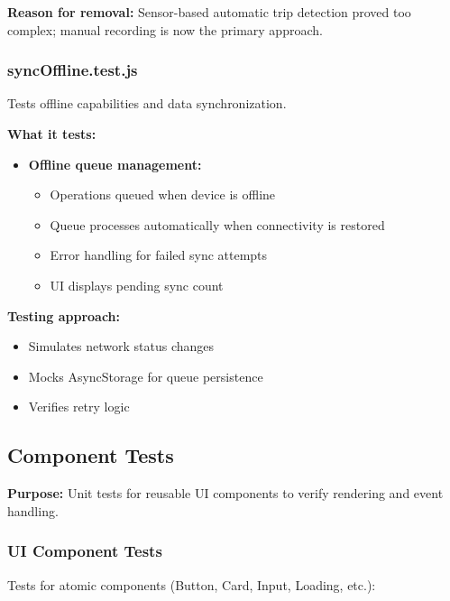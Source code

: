 \textbf{Reason for removal:} Sensor-based automatic trip detection proved too complex; manual recording is now the primary approach.

\subsubsection{syncOffline.test.js}
\label{subsubsec:sync_offline_test}

Tests offline capabilities and data synchronization.

\textbf{What it tests:}
\begin{itemize}
    \item \textbf{Offline queue management:}
    \begin{itemize}
        \item Operations queued when device is offline
        \item Queue processes automatically when connectivity is restored
        \item Error handling for failed sync attempts
        \item UI displays pending sync count
    \end{itemize}
\end{itemize}

\textbf{Testing approach:}
\begin{itemize}
    \item Simulates network status changes
    \item Mocks AsyncStorage for queue persistence
    \item Verifies retry logic
\end{itemize}

\subsection{Component Tests}
\label{subsec:component_tests}

\textbf{Purpose:} Unit tests for reusable UI components to verify rendering and event handling.

\subsubsection{UI Component Tests}
\label{subsubsec:ui_component_tests}

Tests for atomic components (Button, Card, Input, Loading, etc.):

